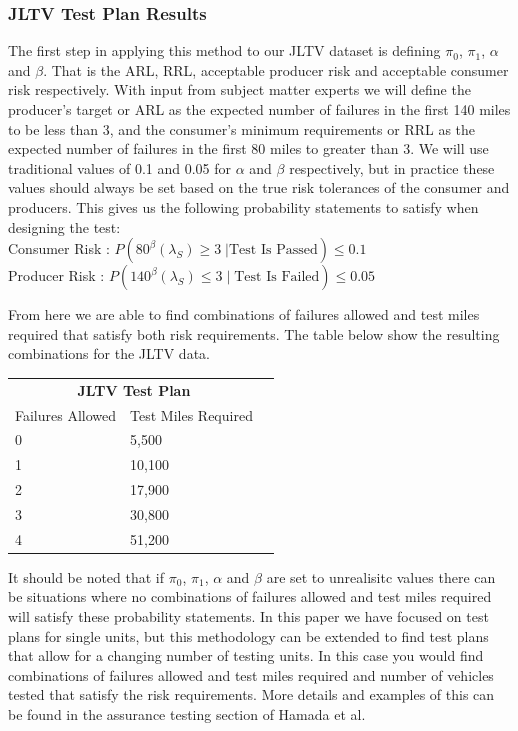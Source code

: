 \documentclass[12pt]{article}
\begin{document}
\subsubsection{JLTV Test Plan Results}
The first step in applying this method to our JLTV dataset is defining $\pi_0$,
$\pi_1$, $\alpha$ and $\beta$.  That is the ARL, RRL, acceptable producer risk
and acceptable consumer risk respectively.  With input from subject matter
experts  we will define the producer's target or ARL as the expected number of
failures in the first 140 miles to be less  than 3, and the consumer's minimum
requirements or RRL as the expected number of failures in  the first 80 miles to
greater than 3.  We will use traditional values of 0.1 and 0.05 for $\alpha$ and
$\beta$ respectively, but in practice these values should always be set based on
the true risk tolerances of the consumer and producers.  This gives us the
following probability statements to satisfy when designing the test:
\\
Consumer Risk : $ P(80^\beta (\lambda_S) \geq 3 \; \vert \text{Test Is Passed}) \leq 0.1 $ \\
Producer Risk : $ P(140^\beta (\lambda_S) \leq 3 \; \vert \; \text{Test Is Failed}) \leq 0.05 $

From here we are able to find combinations of failures allowed and test miles
required that satisfy both risk requirements.  The table below show the
resulting combinations for the JLTV data.

\begin{table}[h]
\center
\begin{tabular}{|l|l|r|}
\multicolumn{2}{c}{\textbf{JLTV Test Plan}} \\
\cline{1-2}
Failures Allowed    & Test Miles Required \\
\hline
0   & 5,500      \\
1   & 10,100      \\
2   & 17,900      \\
3   & 30,800     \\
4   & 51,200     \\
\hline
\end{tabular}
\end{table}

It should be noted that if $\pi_0$, $\pi_1$, $\alpha$ and $\beta$ are set to
unrealisitc values there can be situations where no combinations of failures
allowed and test miles required will satisfy these probability statements.  In
this paper we have focused on test plans for single units, but this methodology
can be extended to find test plans that allow for a changing number of testing
units.  In this case you would find combinations of failures allowed and test
miles required and number of vehicles tested that satisfy the risk requirements.
More details and examples of this can be found in the assurance testing section
of Hamada et al. ~\cite{ref4}
\end{document}

